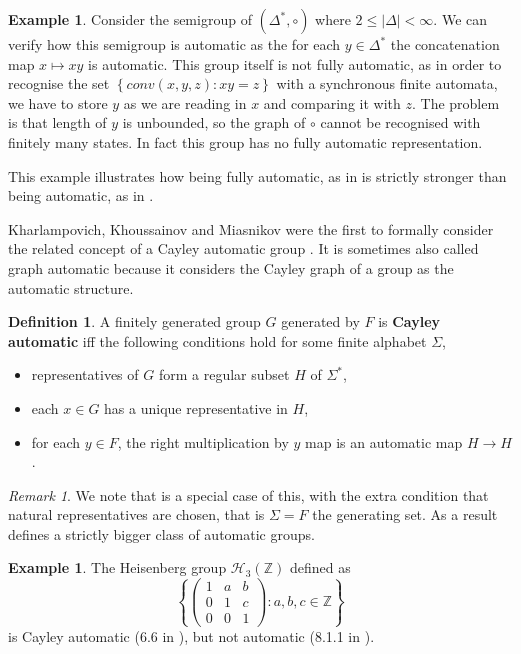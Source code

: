 \documentclass[british,a4paper,]{scrartcl}
\theoremstyle{definition}
\newtheorem{definition}[theorem]{Definition}
\newtheorem{example}[theorem]{Example}
\theoremstyle{remark}
\newtheorem*{remark}{Remark}
\newcommand{\set}[1]{\left\{ #1 \right\}}
\newcommand{\abs}[1]{\left\lvert #1 \right\rvert}
\newcommand{\Z}{\mathbb{Z}}
\begin{document}
\begin{example}
    Consider the semigroup of \((\Delta^*, \circ)\) where \(2 \leq \abs{\Delta} < \infty\).
    We can verify how this semigroup is automatic  as the for each \(y \in \Delta^*\)
    the concatenation map \(x \mapsto xy\) is automatic.
    This group itself is not fully automatic, as in order to recognise the set
    \(\set{conv(x,y,z) : xy = z}\) with a synchronous finite automata,
    we have to store \(y\) as we are reading in \(x\) and comparing it with \(z\).
    The problem is that length of \(y\) is unbounded, so the graph of \(\circ\) cannot be recognised with finitely many states.
    In fact this group has no fully automatic representation.
\end{example}
This example illustrates how being fully automatic, as in  is
strictly stronger than being automatic, as in .

Kharlampovich, Khoussainov and Miasnikov were the first to formally consider the related concept of a Cayley automatic group \autocite{KKM}.
It is sometimes also called graph automatic because it considers the Cayley graph of a group as the automatic structure.
\begin{definition} \label{defn:cayleyauto}
    A finitely generated group \(G\) generated by \(F\) is \textbf{Cayley automatic} iff
    the following conditions hold for some finite alphabet \(\Sigma\),
    \begin{itemize}
        \item representatives of \(G\) form a regular subset \(H\) of \(\Sigma^*\),
        \item each \(x\in G\) has a unique representative in \(H\),
        \item for each \(y\in F\), the right multiplication by \(y\) map is an automatic map \(H\to H\).
    \end{itemize}
\end{definition}

\begin{remark}
    We note that  is a special case of this,
    with the extra condition that natural representatives are chosen,
    that is \(\Sigma = F\) the generating set.
    As a result  defines a strictly bigger class of automatic groups.
\end{remark}

\begin{example}
    The Heisenberg group \(\mathcal{H}_3(\Z)\) defined as
    \[\set{\begin{pmatrix}1&a&b\\0&1&c\\0&0&1\end{pmatrix}: a,b,c\in\Z}\]
    is Cayley automatic (6.6 in \autocite{KKM}), but not automatic (8.1.1 in \autocite{Epstein}).
\end{example}
\end{document}
